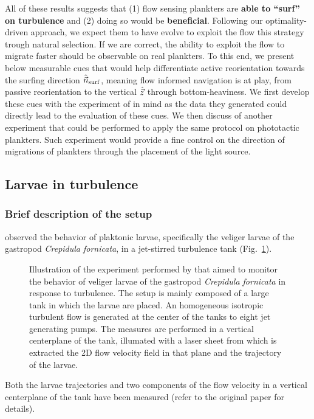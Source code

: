 All of these results suggests that (1) flow sensing plankters are \textbf{able to ``surf'' on turbulence} and (2) doing so would be \textbf{beneficial}.
Following our optimality-driven approach, we expect them to have evolve to exploit the flow this strategy trough natural selection.
If we are correct, the ability to exploit the flow to migrate faster should be observable on real plankters.
To this end, we present below measurable cues that would help differentiate active reorientation towards the surfing direction $\hat{\vec{n}}_{\mathrm{surf}}$, meaning flow informed navigation is at play, from passive reorientation to the vertical $\hat{\vec{z}}$ through bottom-heaviness.
We first develop these cues with the experiment of \citet{dibenedetto2022responding} in mind as the data they generated could directly lead to the evaluation of these cues.
We then discuss of another experiment that could be performed to apply the same protocol on phototactic plankters.
Such experiment would provide a fine control on the direction of migrations of plankters through the placement of the light source.

\subsection{Larvae in turbulence}

\subsubsection{Brief description of the setup}

\citet{dibenedetto2022responding} observed the behavior of plaktonic larvae, specifically the veliger larvae of the gastropod \textit{Crepidula fornicata}, in a jet-stirred turbulence tank (Fig.~\ref{fig:tank}).
\begin{figure}%
	\centering
	\def\svgwidth{0.9\textwidth}
	
	\caption[Illustration of the experiment performed by \citet{dibenedetto2022responding}.]{
		Illustration of the experiment performed by \citet{dibenedetto2022responding} that aimed to monitor the behavior of veliger larvae of the gastropod \textit{Crepidula fornicata} in response to turbulence.
		The setup is mainly composed of a large tank in which the larvae are placed. 
		An homogeneous isotropic turbulent flow is generated at the center of the tanks to eight jet generating pumps.
		The measures are performed in a vertical centerplane of the tank, illumated with a laser sheet from which is extracted the 2D flow velocity field in that plane and the trajectory of the larvae.
	}
	\label{fig:tank}
\end{figure}
Both the larvae trajectories and two components of the flow velocity in a vertical centerplane of the tank have been measured (refer to the original paper for details).

